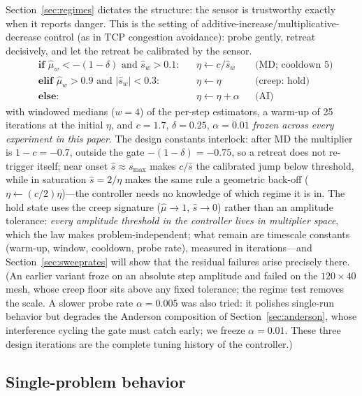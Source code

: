 \documentclass[11pt,a4paper]{article}
\newcommand{\smax}{s_{\max}}
\newcommand{\muh}{\hat{\mu}}
\newcommand{\sh}{\hat{s}}
\begin{document}
Section~\ref{sec:regimes} dictates the structure: the sensor is
trustworthy exactly when it reports danger. This is the setting of
additive-increase/multiplicative-decrease control (as in TCP congestion
avoidance): probe gently, retreat decisively, and let the retreat be
calibrated by the sensor.
\begin{equation}
\begin{aligned}
&\textbf{if } \muh_w < -(1-\delta) \text{ and } \sh_w > 0.1:
  && \eta \leftarrow c/\sh_w
  && \text{(MD; cooldown 5)}\\
&\textbf{elif } \muh_w > 0.9 \text{ and } |\sh_w| < 0.3:
  && \eta \leftarrow \eta
  && \text{(creep: hold)}\\
&\textbf{else}: && \eta \leftarrow \eta + \alpha
  && \text{(AI)}
\end{aligned}
\label{eq:aimd}
\end{equation}
with windowed medians ($w=4$) of the per-step estimators, a warm-up of
25 iterations at the initial $\eta$, and $c=1.7$, $\delta=0.25$,
$\alpha=0.01$ \emph{frozen across every experiment in this paper}. The
design constants interlock: after MD the multiplier is $1-c=-0.7$,
outside the gate $-(1-\delta)=-0.75$, so a retreat does not re-trigger
itself; near onset $\sh\approx\smax$ makes $c/\sh$ the calibrated jump
below threshold, while in saturation $\sh=2/\eta$ makes the same rule a
geometric back-off ($\eta\leftarrow(c/2)\eta$)---the controller needs no
knowledge of which regime it is in. The hold state uses the creep
signature ($\muh\to1$, $\sh\to0$) rather than an amplitude tolerance:
\emph{every amplitude threshold in the controller lives in multiplier
space}, which the law makes problem-independent; what remain are
timescale constants (warm-up, window, cooldown, probe rate), measured in
iterations---and Section~\ref{sec:sweeprates} will show that the
residual failures arise precisely there. (An earlier
variant froze on an absolute step amplitude and failed on the
$120\times40$ mesh, whose creep floor sits above any fixed tolerance;
the regime test removes the scale. A slower probe rate
$\alpha=0.005$ was also tried: it polishes single-run behavior but
degrades the Anderson composition of
Section~\ref{sec:anderson}, whose interference cycling the gate must
catch early; we freeze $\alpha=0.01$. These three design iterations are
the complete tuning history of the controller.)

\subsection{Single-problem behavior}\label{sec:demos}
\end{document}
